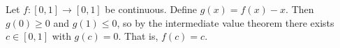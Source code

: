 Let $f : [0, 1] \to [0, 1]$ be continuous.
Define $g(x) = f(x) - x$.
Then $g(0) \geq 0$ and $g(1) \leq 0$, so by the intermediate value theorem there exists $c \in [0, 1]$ with $g(c) = 0$.
That is, $f(c) = c$.
